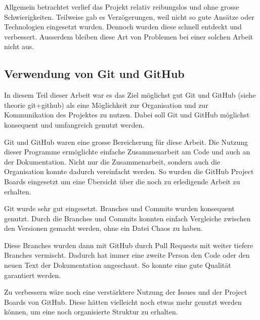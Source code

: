 Allgemein betrachtet verlief das Projekt relativ reibungslos und ohne grosse
Schwierigkeiten. Teilweise gab es Verzögerungen, weil nicht so gute Ansätze oder
Technologien eingesetzt wurden. Dennoch wurden diese schnell entdeckt und
verbessert. Ausserdem bleiben diese Art von Problemen bei einer solchen Arbeit
nicht aus.


\subsection*{Verwendung von Git und GitHub}
In diesem Teil dieser Arbeit war es das Ziel möglichst gut Git und GitHub (siehe
theorie git+github)  %
als eine Möglichkeit zur Organisation und zur Kommunikation des Projektes zu
nutzen. Dabei soll Git und GitHub möglichst konsequent und umfangreich genutzt
werden.

Git und GitHub waren eine grosse Bereicherung für diese Arbeit. Die
Nutzung dieser Programme ermöglichte einfache Zusammenarbeit am Code und auch an
der Dokumentation. Nicht nur die Zusammenarbeit, sondern auch die Organisation
konnte dadurch vereinfacht werden. So wurden die GitHub Project Boards
eingesetzt um eine Übersicht über die noch zu erledigende Arbeit zu erhalten.

Git wurde sehr gut eingesetzt. Branches und Commits wurden konsequent genutzt.
Durch die Branches und Commits konnten einfach Vergleiche zwischen den Versionen
gemacht werden, ohne ein Datei Chaos zu haben.

Diese Branches wurden dann mit GitHub durch Pull Requests mit weiter tiefere
Branches vermischt. Dadurch hat immer eine zweite Person den Code oder den neuen
Text der Dokumentation angeschaut. So konnte eine gute Qualität garantiert
werden.


Zu verbessern wäre noch eine verstärktere Nutzung der Issues und der Project
Boards von GitHub. Diese hätten vielleicht noch etwas mehr genutzt werden
können, um eine noch organisierte Struktur zu erhalten.

